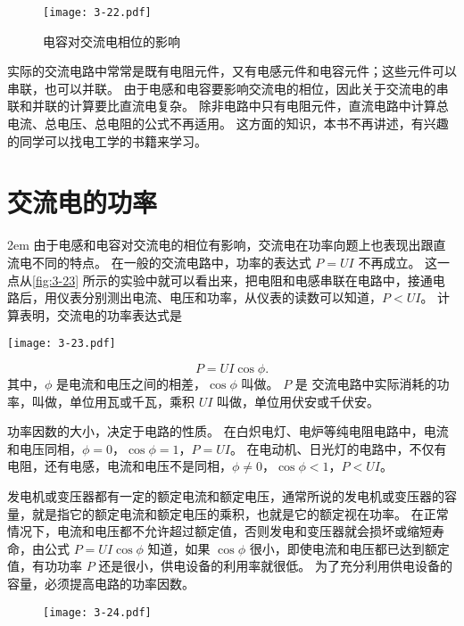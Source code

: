 \begin{figure}
  \texttt{[image: 3-22.pdf]}
  \caption{电容对交流电相位的影响}\label{fig:3-22}
\end{figure}

实际的交流电路中常常是既有电阻元件，又有电感元件和电容元件；这些元件可以串联，也可以并联。
由于电感和电容要影响交流电的相位，因此关于交流电的串联和并联的计算要比直流电复杂。
除非电路中只有电阻元件，直流电路中计算总电流、总电压、总电阻的公式不再适用。
这方面的知识，本书不再讲述，有兴趣的同学可以找电工学的书籍来学习。

\section{交流电的功率}
\medskip\noindent
\begin{minipage}{0.6\linewidth}\parindent2em
由于电感和电容对交流电的相位有影响，交流电在功率向题上也表现出跟直流电不同的特点。
在一般的交流电路中，功率的表达式 $P=UI$ 不再成立。
这一点从\cref{fig:3-23} 所示的实验中就可以看出来，把电阻和电感串联在电路中，接通电路后，用仪表分别测出电流、电压和功率，从仪表的读数可以知道，$P<UI$。
计算表明，交流电的功率表达式是
\end{minipage}\hfill
\begin{minipage}{0.35\linewidth}\centering
  \begin{figurehere}
    \texttt{[image: 3-23.pdf]}
    \caption{}\label{fig:3-23}
  \end{figurehere}
\end{minipage}%
\[P=UI\cos\phi.\]
其中，$\phi$ 是电流和电压之间的相差，$\cos\phi$ 叫做。
$P$ 是
交流电路中实际消耗的功率，叫做，单位用瓦或千瓦，乘积 $UI$ 叫做，单位用伏安或千伏安。

功率因数的大小，决定于电路的性质。
在白炽电灯、电炉等纯电阻电路中，电流和电压同相，$\phi=0$，$\cos\phi=1$，$P=UI$。
在电动机、日光灯的电路中，不仅有电阻，还有电感，电流和电压不是同相，$\phi\ne 0$，$\cos\phi<1$，$P<UI$。

发电机或变压器都有一定的额定电流和额定电压，通常所说的发电机或变压器的容量，就是指它的额定电流和额定电压的乘积，也就是它的额定视在功率。
在正常情况下，电流和电压都不允许超过额定值，否则发电和变压器就会损坏或缩短寿命，由公式 $P=UI\cos\phi$ 知道，如果 $\cos\phi$ 很小，即使电流和电压都已达到额定值，有功功率 $P$ 还是很小，供电设备的利用率就很低。
为了充分利用供电设备的容量，必须提高电路的功率因数。

\begin{figure}
  \texttt{[image: 3-24.pdf]}
\caption{}\label{fig:3-24}
\end{figure}

